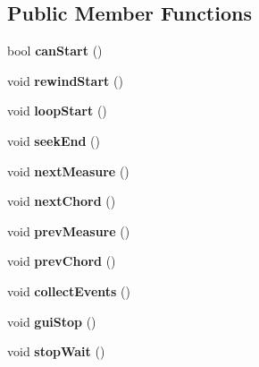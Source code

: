 \subsection*{Public Member Functions}
\begin{DoxyCompactItemize}
\item 
\mbox{\label{class_ms_1_1_seq_a3e2066fafa6413eaaf0843a12ff96e2a}} 
bool {\bfseries can\+Start} ()
\item 
\mbox{\label{class_ms_1_1_seq_a11d3d3b11d186fb3ae276474f150897d}} 
void {\bfseries rewind\+Start} ()
\item 
\mbox{\label{class_ms_1_1_seq_acae7e066eafa08c09c4263bac4f57ef1}} 
void {\bfseries loop\+Start} ()
\item 
\mbox{\label{class_ms_1_1_seq_a4b3b14bd323f8413cb1c1f2f4f6d0d09}} 
void {\bfseries seek\+End} ()
\item 
\mbox{\label{class_ms_1_1_seq_a315f95b5bb5a6c097bc5b5a0149c0d7f}} 
void {\bfseries next\+Measure} ()
\item 
\mbox{\label{class_ms_1_1_seq_acea389762f5cabced8927c32e546b5fb}} 
void {\bfseries next\+Chord} ()
\item 
\mbox{\label{class_ms_1_1_seq_a3ebaae2d12ff06f05cdf3030821263f7}} 
void {\bfseries prev\+Measure} ()
\item 
\mbox{\label{class_ms_1_1_seq_a147efd38b3accd861bdfd396d744da2d}} 
void {\bfseries prev\+Chord} ()
\item 
\mbox{\label{class_ms_1_1_seq_a0b9995def38b383859469ceecdb0937a}} 
void {\bfseries collect\+Events} ()
\item 
\mbox{\label{class_ms_1_1_seq_aeb846dd8637cb7fe9177bc1714c4374f}} 
void {\bfseries gui\+Stop} ()
\item 
\mbox{\label{class_ms_1_1_seq_a864dc32124ff7a2b23312a97626b9398}} 
void {\bfseries stop\+Wait} ()
\item 

\end{DoxyCompactItemize}
